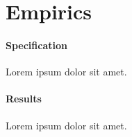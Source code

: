\documentclass[main.tex]{subfiles}
\begin{document}
\section{Empirics}\label{s:empirics}

\paragraph{Specification} Lorem ipsum dolor sit amet.

\paragraph{Results} Lorem ipsum dolor sit amet.
\end{document}
